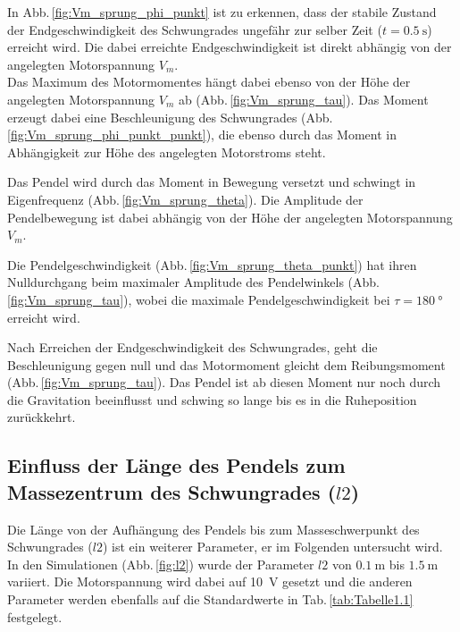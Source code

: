 In Abb.\,\ref{fig:Vm_sprung_phi_punkt} ist zu erkennen, dass der stabile Zustand der Endgeschwindigkeit des Schwungrades ungefähr zur selber Zeit ($t=\SI{0.5}{\s}$) erreicht wird.
Die dabei erreichte Endgeschwindigkeit ist direkt abhängig von der angelegten Motorspannung $V_m$.\\
Das Maximum des Motormomentes hängt dabei ebenso von der Höhe der angelegten Motorspannung $V_m$ ab (Abb.\,\ref{fig:Vm_sprung_tau}).
Das Moment erzeugt dabei eine Beschleunigung des Schwungrades (Abb.\,\ref{fig:Vm_sprung_phi_punkt_punkt}), die ebenso durch das Moment in Abhängigkeit zur Höhe des angelegten Motorstroms steht.

Das Pendel wird durch das Moment in Bewegung versetzt und schwingt in Eigenfrequenz (Abb.\,\ref{fig:Vm_sprung_theta}). 
Die Amplitude der Pendelbewegung ist dabei abhängig von der Höhe der angelegten Motorspannung $V_m$.

Die Pendelgeschwindigkeit (Abb.\,\ref{fig:Vm_sprung_theta_punkt}) hat ihren Nulldurchgang beim maximaler Amplitude des Pendelwinkels (Abb.\,\ref{fig:Vm_sprung_tau}), wobei die maximale Pendelgeschwindigkeit bei $\tau=\SI{180}{\degree}$ erreicht wird.

Nach Erreichen der Endgeschwindigkeit des Schwungrades, geht die Beschleunigung gegen null und das Motormoment gleicht dem Reibungsmoment (Abb.\,\ref{fig:Vm_sprung_tau}).
Das Pendel ist ab diesen Moment nur noch durch die Gravitation beeinflusst und schwing so lange bis es in die Ruheposition zurückkehrt.

\subsection*{Einfluss der Länge des Pendels zum Massezentrum des Schwungrades ($l2$)}
Die Länge von der Aufhängung des Pendels bis zum Masseschwerpunkt des Schwungrades ($l2$) ist ein weiterer Parameter, er im Folgenden untersucht wird.
In den Simulationen (Abb.\,\ref{fig:l2}) wurde der Parameter $l2$ von $\SI{0.1}{\m}$ bis $\SI{1.5}{\m}$ variiert.
Die Motorspannung wird dabei auf \SI{10}{\volt} gesetzt und die anderen Parameter werden ebenfalls auf die Standardwerte in Tab.\,\ref{tab:Tabelle1.1} festgelegt.
\pagebreak

